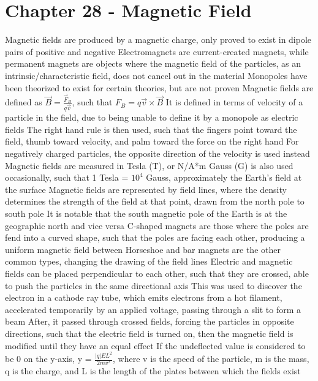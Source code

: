 \documentclass[11 pt, twoside]{article}
\newenvironment{outline*}
{
	\begin{outline}[enumerate]
	}
	{\end{outline}
}
\begin{document}
\section{Chapter 28 - Magnetic Field}
\begin{outline*}
\1 Magnetic fields are produced by a magnetic charge, only proved to exist in dipole pairs of positive and negative
\2 Electromagnets are current-created magnets, while permanent magnets are objects where the magnetic field of the particles, as an intrinsic/characteristic field, does not cancel out in the material
\2 Monopoles have been theorized to exist for certain theories, but are not proven
\1 Magnetic fields are defined as $\vec{B} = \frac{\vec{F}_B}{q\vec{v}}$, such that $F_B = q\vec{v} \times \vec{B}$
\2 It is defined in terms of velocity of a particle in the field, due to being unable to define it by a monopole as electric fields
\2 The right hand rule is then used, such that the fingers point toward the field, thumb toward velocity, and palm toward the force on the right hand
\3 For negatively charged particles, the opposite direction of the velocity is used instead
\2 Magnetic fields are measured in Tesla (T), or N/A*m
\3 Gauss (G) is also used occasionally, such that 1 Tesla = $10^4$ Gauss, approximately the Earth's field at the surface
\1 Magnetic fields are represented by field lines, where the density determines the strength of the field at that point, drawn from the north pole to south pole
\2 It is notable that the south magnetic pole of the Earth is at the geographic north and vice versa
\1 C-shaped magnets are those where the poles are fend into a curved shape, such that the poles are facing each other, producing a uniform magnetic field between
\2 Horseshoe and bar magnets are the other common types, changing the drawing of the field lines
\1 Electric and magnetic fields can be placed perpendicular to each other, such that they are crossed, able to push the particles in the same directional axis
\2 This was used to discover the electron in a cathode ray tube, which emits electrons from a hot filament, accelerated temporarily by an applied voltage, passing through a slit to form a beam
\3 After, it passed through crossed fields, forcing the particles in opposite directions, such that the electric field is turned on, then the magnetic field is modified until they have an equal effect
\3 If the undeflected value is considered to be 0 on the y-axis, y = $\frac{|q|EL^2}{2mv^2}$, where v is the speed of the particle, m is the mass, q is the charge, and L is the length of the plates between which the fields exist

\end{outline*}
\end{document}
